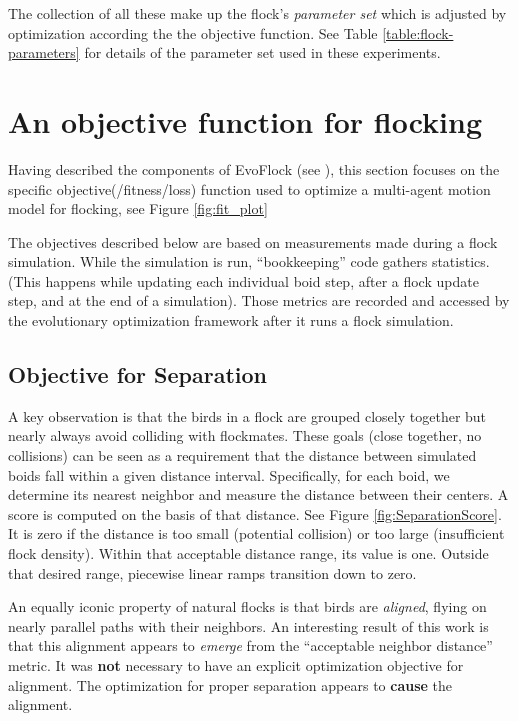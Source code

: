 \documentclass[letterpaper]{article}
\begin{document}
The collection of all these make up the flock's \textit{parameter set} which is adjusted by optimization according the the objective function. See Table \ref{table:flock-parameters} for details of the parameter set used in these experiments.

\section{An objective function for flocking}
\label{sec:FlockingObjective}

Having described the components of EvoFlock (see ), this section focuses on the specific objective(/fitness/loss) function used to optimize a multi-agent motion model for flocking, see Figure \ref{fig:fit_plot}

The objectives described below are based on measurements made during a flock simulation. While the simulation is run, ``bookkeeping'' code gathers statistics. (This happens while updating each individual boid step, after a flock update step, and at the end of a simulation). Those metrics are recorded and accessed by the evolutionary optimization framework after it runs a flock simulation.

\subsection{Objective for Separation}
\label{subsec:separation_objective}

A key observation is that the birds in a flock are grouped closely together but nearly always avoid colliding with flockmates. These goals (close together, no collisions) can be seen as a requirement that the distance between simulated boids fall within a given distance interval. Specifically, for each boid, we determine its nearest neighbor and measure the distance between their centers. A score is computed on the basis of that distance. See Figure \ref{fig:SeparationScore}. It is zero if the distance is too small (potential collision) or too large (insufficient flock density). Within that acceptable distance range, its value is one. Outside that desired range, piecewise linear ramps transition down to zero.

An equally iconic property of natural flocks is that birds are \textit{aligned}, flying on nearly parallel paths with their neighbors. An interesting result of this work is that this alignment appears to \textit{emerge} from the ``acceptable neighbor distance'' metric. It was \textbf{not} necessary to have an explicit optimization objective for alignment. The optimization for proper separation appears to \textbf{cause} the alignment.
\end{document}
